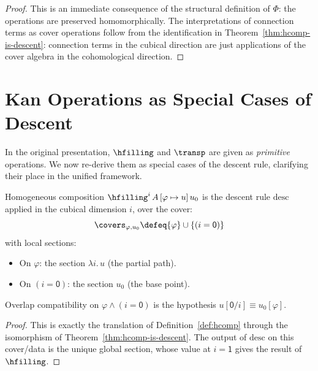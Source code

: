 \begin{proof}
This is an immediate consequence of the structural definition of $\Phi$:
the operations are preserved homomorphically.  The interpretations of
connection terms as cover operations follow from the identification in
Theorem~\ref{thm:hcomp-is-descent}: connection terms in the cubical
direction are just applications of the cover algebra in the
cohomological direction.
\end{proof}


\section{Kan Operations as Special Cases of Descent}
\label{sec:kan-ops}

In the original presentation, $\hfilling$ and $\transp$ are given as
\emph{primitive} operations.  We now re-derive them as special cases of the
descent rule, clarifying their place in the unified framework.

\begin{proposition}
\label{prop:hfill-is-descent}
Homogeneous composition $\hfilling^i\, A\, [\varphi \mapsto u]\, u_0$
is the descent rule $\mathrm{desc}$ applied in the cubical dimension $i$,
over the cover:
\[
  \covers_{\varphi, u_0} \defeq
  \{\varphi\} \cup \{(i = \mathsf{0})\}
\]
with local sections:
\begin{itemize}
\item On $\varphi$: the section $\lambda i.\, u$ (the partial path).
\item On $(i = \mathsf{0})$: the section $u_0$ (the base point).
\end{itemize}
Overlap compatibility on $\varphi \wedge (i = \mathsf{0})$ is the
hypothesis $u[\mathsf{0}/i] \equiv u_0[\varphi]$.
\end{proposition}

\begin{proof}
This is exactly the translation of Definition~\ref{def:hcomp} through the
isomorphism of Theorem~\ref{thm:hcomp-is-descent}.  The output of
$\mathrm{desc}$ on this cover/data is the unique global section, whose value
at $i = \mathsf{1}$ gives the result of $\hfilling$.
\end{proof}


